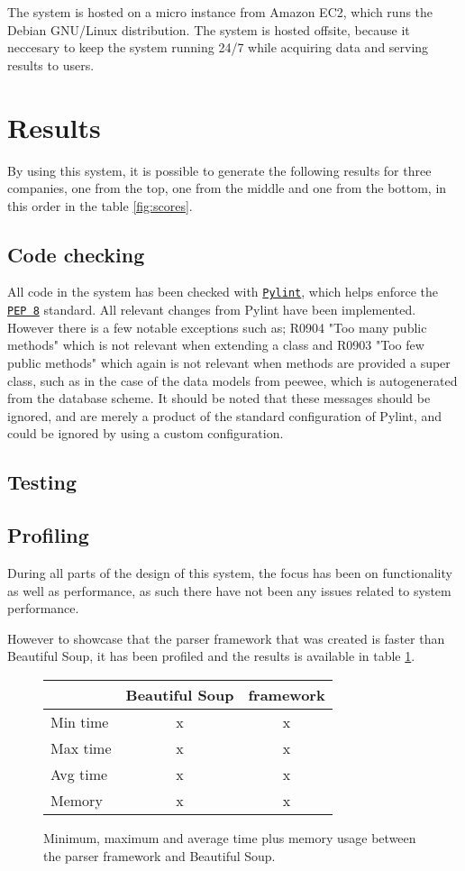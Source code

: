 \documentclass[10pt]{IEEEtran}
\begin{document}
The system is hosted on a micro instance from Amazon EC2, which runs the Debian GNU/Linux distribution. The system is hosted offsite, because it neccesary to keep the system running 24/7 while acquiring data and serving results to users.

\section{Results}
By using this system, it is possible to generate the following results for three companies, one from the top, one from the middle and one from the bottom, in this order in the table \ref{fig:scores}.

\subsection{Code checking}
All code in the system has been checked with \href{http://www.pylint.org/}{\texttt{Pylint}}, which helps enforce the \href{http://www.python.org/dev/peps/pep-0008/}{\texttt{PEP 8}} standard. All relevant changes from Pylint have been implemented. However there is a few notable exceptions such as; R0904 "Too many public methods" which is not relevant when extending a class and R0903 "Too few public methods" which again is not relevant when methods are provided a super class, such as in the case of the data models from peewee, which is autogenerated from the database scheme. It should be noted that these messages should be ignored, and are merely a product of the standard configuration of Pylint, and could be ignored by using a custom configuration.

\subsection{Testing}


\subsection{Profiling}
During all parts of the design of this system, the focus has been on functionality as well as performance, as such there have not been any issues related to system performance.

However to showcase that the parser framework that was created is faster than Beautiful Soup, it has been profiled and the results is available in table \ref{fig:profiling}.

\begin{figure}[!h]
	\begin{tabular}{ | l | c | c | }
  		\hline
   		 & \textbf{Beautiful Soup} & \textbf{framework} \\ \hline
  		Min time & x & x \\ \hline
  		Max time & x & x \\ \hline
  		Avg time & x & x \\ \hline
  		Memory & x & x \\ \hline
	\end{tabular}
	\caption{Minimum, maximum and average time plus memory usage between the parser framework and Beautiful Soup. \label{fig:profiling}}
\end{figure}
\end{document}
